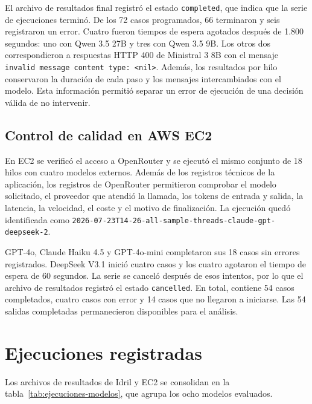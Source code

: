 El archivo de resultados final registró el estado \texttt{completed}, que indica que la serie de ejecuciones terminó. De los 72 casos programados, 66 terminaron y seis registraron un error. Cuatro fueron tiempos de espera agotados después de 1.800 segundos: uno con Qwen 3.5 27B y tres con Qwen 3.5 9B. Los otros dos correspondieron a respuestas HTTP 400 de Ministral 3 8B con el mensaje \texttt{invalid message content type: <nil>}. Además, los resultados por hilo conservaron la duración de cada paso y los mensajes intercambiados con el modelo. Esta información permitió separar un error de ejecución de una decisión válida de no intervenir.

\subsection{Control de calidad en AWS EC2}

En EC2 se verificó el acceso a OpenRouter y se ejecutó el mismo conjunto de 18 hilos con cuatro modelos externos. Además de los registros técnicos de la aplicación, los registros de OpenRouter permitieron comprobar el modelo solicitado, el proveedor que atendió la llamada, los tokens de entrada y salida, la latencia, la velocidad, el coste y el motivo de finalización. La ejecución quedó identificada como \texttt{2026-07-23T14-26-all-sample-threads-claude-gpt-deepseek-2}.

GPT-4o, Claude Haiku 4.5 y GPT-4o-mini completaron sus 18 casos sin errores registrados. DeepSeek V3.1 inició cuatro casos y los cuatro agotaron el tiempo de espera de 60 segundos. La serie se canceló después de esos intentos, por lo que el archivo de resultados registró el estado \texttt{cancelled}. En total, contiene 54 casos completados, cuatro casos con error y 14 casos que no llegaron a iniciarse. Las 54 salidas completadas permanecieron disponibles para el análisis.

\section{Ejecuciones registradas}

Los archivos de resultados de Idril y EC2 se consolidan en la tabla~\ref{tab:ejecuciones-modelos}, que agrupa los ocho modelos evaluados.

